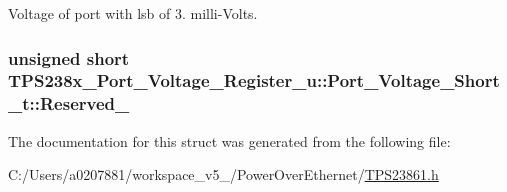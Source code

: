 Voltage of port with lsb of 3. milli-\/\-Volts. 

\hypertarget{struct_t_p_s238x___port___voltage___register__u_1_1_port___voltage___short__t_a91a7e6ab0161eeeef593d6810203ef4c}{
\subsubsection[{Reserved\-\_\-16}]{\setlength{\rightskip}{0pt plus 5cm}unsigned short T\-P\-S238x\-\_\-\-Port\-\_\-\-Voltage\-\_\-\-Register\-\_\-u\-::\-Port\-\_\-\-Voltage\-\_\-\-Short\-\_\-t\-::\-Reserved\-\_}}\label{struct_t_p_s238x___port___voltage___register__u_1_1_port___voltage___short__t_a91a7e6ab0161eeeef593d6810203ef4c}


The documentation for this struct was generated from the following file\-:\begin{DoxyCompactItemize}
\item 
C\-:/\-Users/a0207881/workspace\-\_\-v5\-\_/\-Power\-Over\-Ethernet/\hyperlink{_t_p_s23861_8h}{T\-P\-S23861.\-h}\end{DoxyCompactItemize}
